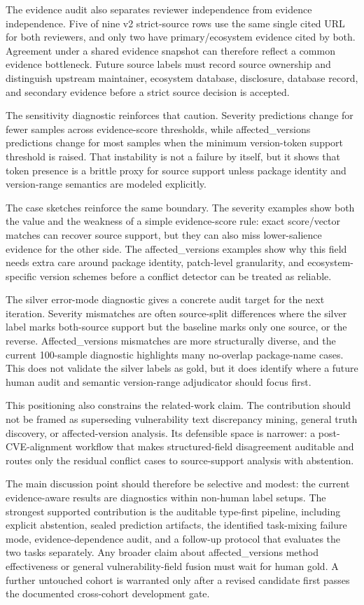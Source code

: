 The evidence audit also separates reviewer independence from evidence independence. Five of nine v2 strict-source rows use the same single cited URL for both reviewers, and only two have primary/ecosystem evidence cited by both. Agreement under a shared evidence snapshot can therefore reflect a common evidence bottleneck. Future source labels must record source ownership and distinguish upstream maintainer, ecosystem database, disclosure, database record, and secondary evidence before a strict source decision is accepted.

The sensitivity diagnostic reinforces that caution. Severity predictions change for fewer samples across evidence-score thresholds, while affected\_versions predictions change for most samples when the minimum version-token support threshold is raised. That instability is not a failure by itself, but it shows that token presence is a brittle proxy for source support unless package identity and version-range semantics are modeled explicitly.

The case sketches reinforce the same boundary. The severity examples show both the value and the weakness of a simple evidence-score rule: exact score/vector matches can recover source support, but they can also miss lower-salience evidence for the other side. The affected\_versions examples show why this field needs extra care around package identity, patch-level granularity, and ecosystem-specific version schemes before a conflict detector can be treated as reliable.

The silver error-mode diagnostic gives a concrete audit target for the next iteration. Severity mismatches are often source-split differences where the silver label marks both-source support but the baseline marks only one source, or the reverse. Affected\_versions mismatches are more structurally diverse, and the current 100-sample diagnostic highlights many no-overlap package-name cases. This does not validate the silver labels as gold, but it does identify where a future human audit and semantic version-range adjudicator should focus first.

This positioning also constrains the related-work claim. The contribution should not be framed as superseding vulnerability text discrepancy mining, general truth discovery, or affected-version analysis. Its defensible space is narrower: a post-CVE-alignment workflow that makes structured-field disagreement auditable and routes only the residual conflict cases to source-support analysis with abstention.

The main discussion point should therefore be selective and modest: the current evidence-aware results are diagnostics within non-human label setups. The strongest supported contribution is the auditable type-first pipeline, including explicit abstention, sealed prediction artifacts, the identified task-mixing failure mode, evidence-dependence audit, and a follow-up protocol that evaluates the two tasks separately. Any broader claim about affected\_versions method effectiveness or general vulnerability-field fusion must wait for human gold. A further untouched cohort is warranted only after a revised candidate first passes the documented cross-cohort development gate.
